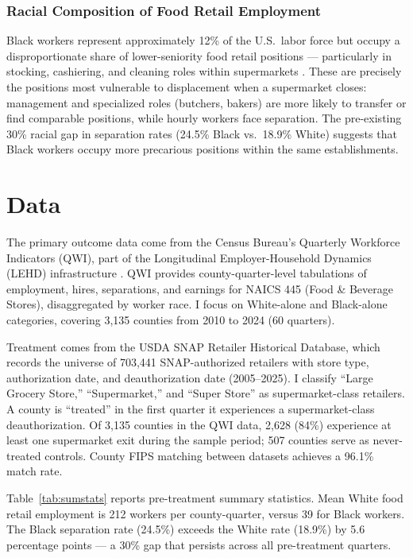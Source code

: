 \documentclass[12pt]{article}
\begin{document}
\subsubsection*{Racial Composition of Food Retail Employment} Black workers represent approximately 12\% of the U.S.\ labor force but occupy a disproportionate share of lower-seniority food retail positions --- particularly in stocking, cashiering, and cleaning roles within supermarkets \citep{abowd2009lehd}. These are precisely the positions most vulnerable to displacement when a supermarket closes: management and specialized roles (butchers, bakers) are more likely to transfer or find comparable positions, while hourly workers face separation. The pre-existing 30\% racial gap in separation rates (24.5\% Black vs.\ 18.9\% White) suggests that Black workers occupy more precarious positions within the same establishments.

\section{Data}

The primary outcome data come from the Census Bureau's Quarterly Workforce Indicators (QWI), part of the Longitudinal Employer-Household Dynamics (LEHD) infrastructure \citep{abowd2009lehd}. QWI provides county-quarter-level tabulations of employment, hires, separations, and earnings for NAICS 445 (Food \& Beverage Stores), disaggregated by worker race. I focus on White-alone and Black-alone categories, covering 3,135 counties from 2010 to 2024 (60 quarters).

Treatment comes from the USDA SNAP Retailer Historical Database, which records the universe of 703,441 SNAP-authorized retailers with store type, authorization date, and deauthorization date (2005--2025). I classify ``Large Grocery Store,'' ``Supermarket,'' and ``Super Store'' as supermarket-class retailers. A county is ``treated'' in the first quarter it experiences a supermarket-class deauthorization. Of 3,135 counties in the QWI data, 2,628 (84\%) experience at least one supermarket exit during the sample period; 507 counties serve as never-treated controls. County FIPS matching between datasets achieves a 96.1\% match rate.



Table~\ref{tab:sumstats} reports pre-treatment summary statistics. Mean White food retail employment is 212 workers per county-quarter, versus 39 for Black workers. The Black separation rate (24.5\%) exceeds the White rate (18.9\%) by 5.6 percentage points --- a 30\% gap that persists across all pre-treatment quarters.
\end{document}
